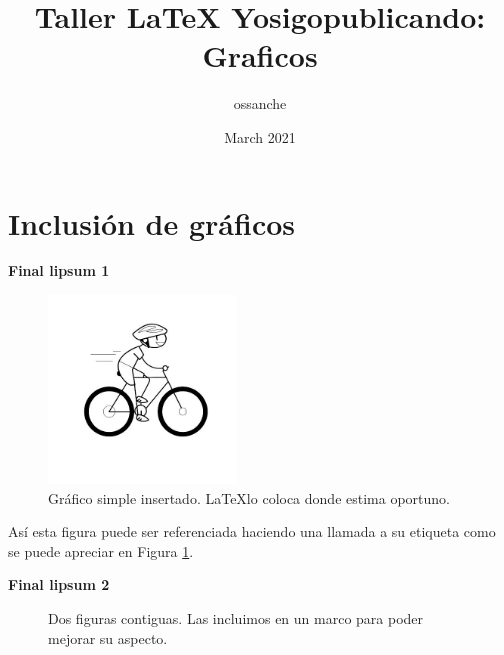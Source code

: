 \documentclass{article}
\title{Taller LaTeX Yosigopublicando: Graficos}
\author{ossanche }
\date{March 2021}
\begin{document}
\maketitle

\section{Inclusión de gráficos}

\lipsum %
{\bf Final lipsum 1}

\begin{figure}[h]
    \centering
    \includegraphics[height=5cm,angle=30]{graficos/ciclista.jpeg}
    \caption{Gráfico simple insertado. \LaTeX lo coloca donde estima oportuno.}
    \label{fig:1}
\end{figure}

Así esta figura puede ser referenciada haciendo una llamada a su etiqueta como se puede apreciar en Figura \ref{fig:1}.

\lipsum %
{\bf Final lipsum 2}

\begin{figure}[h]
    \centering
    \caption{Dos figuras contiguas. Las incluimos en un marco para poder mejorar su aspecto.}
    \label{fig:2}
\end{figure}
\end{document}
